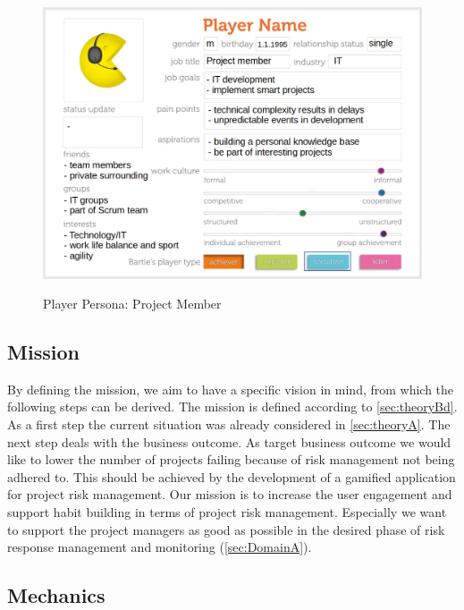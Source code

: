 \begin{figure}[H]
	\centering
	\includegraphics[width=1.0\textwidth]{Content/Domain/PersonaProjectMember.png}
	\caption{Player Persona: Project Member}
	\label{fig:personaProjectMember}
	\cite[p. 88; adapted]{kumarGamificationWorkDesigning2013}
\end{figure}


\subsection{Mission}
\label{sec:domainCb}

By defining the mission, we aim to have a specific vision in mind, from which the following steps can be derived. The mission is defined according to \ref{sec:theoryBd}. 
As a first step the current situation was already considered in \ref{sec:theoryA}. The next step deals with the business outcome. As target business outcome we would like to lower the number of projects failing because of risk management not being adhered to. This should be achieved by the development of a gamified application for project risk management.
Our mission is to increase the user engagement and support habit building in terms of project risk management. Especially we want to support the project managers as good as possible in the desired phase of risk response management and monitoring (\ref{sec:DomainA}).

\subsection{Mechanics}
\label{sec:domainCc}

